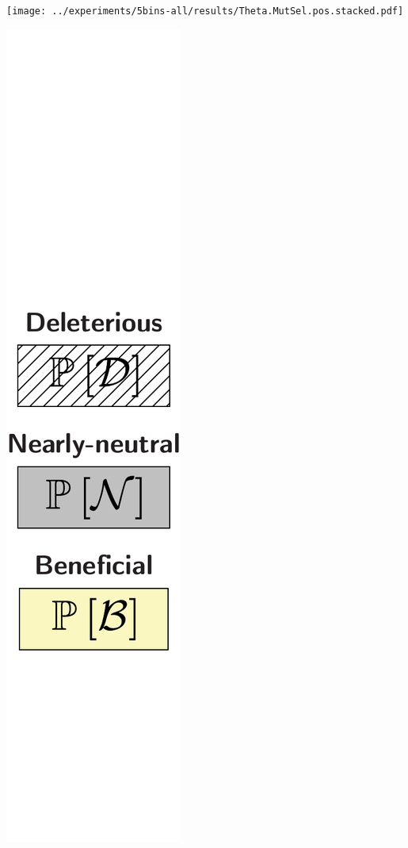 \documentclass{article}
\begin{document}
\begin{center}
\begin{minipage}{0.09\linewidth}
        \end{minipage}
        \begin{minipage}{0.9\linewidth}
            \texttt{[image: ../experiments/5bins-all/results/Theta.MutSel.pos.stacked.pdf]}
        \end{minipage}
        \begin{minipage}{0.09\linewidth}
            \includegraphics[width=\linewidth, page=1]{artworks/legend.polycat}
        \end{minipage}
    \end{center}
\end{document}
